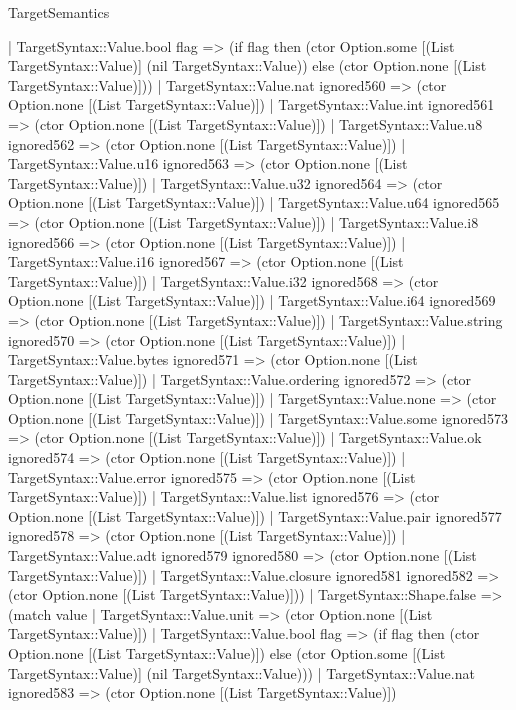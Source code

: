 \begin{lexlean}{TargetSemantics}
\begin{semanticmodule}
{      | TargetSyntax::Value.bool flag => (if flag then (ctor Option.some [(List TargetSyntax::Value)] (nil TargetSyntax::Value)) else (ctor Option.none [(List TargetSyntax::Value)]))
      | TargetSyntax::Value.nat ignored560 => (ctor Option.none [(List TargetSyntax::Value)])
      | TargetSyntax::Value.int ignored561 => (ctor Option.none [(List TargetSyntax::Value)])
      | TargetSyntax::Value.u8 ignored562 => (ctor Option.none [(List TargetSyntax::Value)])
      | TargetSyntax::Value.u16 ignored563 => (ctor Option.none [(List TargetSyntax::Value)])
      | TargetSyntax::Value.u32 ignored564 => (ctor Option.none [(List TargetSyntax::Value)])
      | TargetSyntax::Value.u64 ignored565 => (ctor Option.none [(List TargetSyntax::Value)])
      | TargetSyntax::Value.i8 ignored566 => (ctor Option.none [(List TargetSyntax::Value)])
      | TargetSyntax::Value.i16 ignored567 => (ctor Option.none [(List TargetSyntax::Value)])
      | TargetSyntax::Value.i32 ignored568 => (ctor Option.none [(List TargetSyntax::Value)])
      | TargetSyntax::Value.i64 ignored569 => (ctor Option.none [(List TargetSyntax::Value)])
      | TargetSyntax::Value.string ignored570 => (ctor Option.none [(List TargetSyntax::Value)])
      | TargetSyntax::Value.bytes ignored571 => (ctor Option.none [(List TargetSyntax::Value)])
      | TargetSyntax::Value.ordering ignored572 => (ctor Option.none [(List TargetSyntax::Value)])
      | TargetSyntax::Value.none => (ctor Option.none [(List TargetSyntax::Value)])
      | TargetSyntax::Value.some ignored573 => (ctor Option.none [(List TargetSyntax::Value)])
      | TargetSyntax::Value.ok ignored574 => (ctor Option.none [(List TargetSyntax::Value)])
      | TargetSyntax::Value.error ignored575 => (ctor Option.none [(List TargetSyntax::Value)])
      | TargetSyntax::Value.list ignored576 => (ctor Option.none [(List TargetSyntax::Value)])
      | TargetSyntax::Value.pair ignored577 ignored578 => (ctor Option.none [(List TargetSyntax::Value)])
      | TargetSyntax::Value.adt ignored579 ignored580 => (ctor Option.none [(List TargetSyntax::Value)])
      | TargetSyntax::Value.closure ignored581 ignored582 => (ctor Option.none [(List TargetSyntax::Value)]))
    | TargetSyntax::Shape.false => (match value
      | TargetSyntax::Value.unit => (ctor Option.none [(List TargetSyntax::Value)])
      | TargetSyntax::Value.bool flag => (if flag then (ctor Option.none [(List TargetSyntax::Value)]) else (ctor Option.some [(List TargetSyntax::Value)] (nil TargetSyntax::Value)))
      | TargetSyntax::Value.nat ignored583 => (ctor Option.none [(List TargetSyntax::Value)])
}
\end{semanticmodule}
\end{lexlean}
